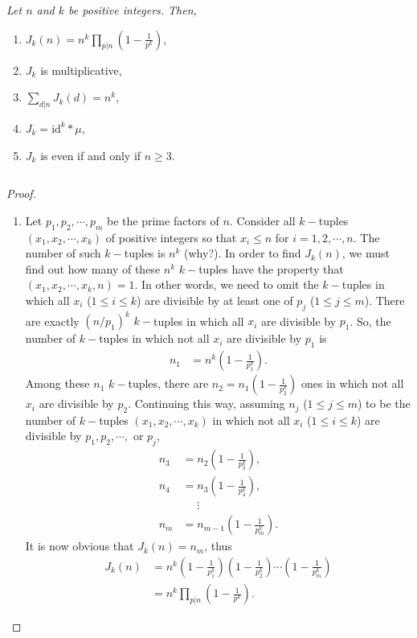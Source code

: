 \documentclass[12pt]{subfile}
\begin{document}
		\begin{theorem} \slshape
			Let $n$ and $k$ be positive integers. Then,
				\begin{enumerate}
					\item $\displaystyle J_k(n) = n^k \prod\limits_{p|n} \left(1 - \frac{1}{p^k}\right)$,
					\item $J_k$ is multiplicative,
					\item $\displaystyle \sum_{d|n} J_k(d) = n^k$,
					\item $J_k = \text{id}^k \ast \mu$,
					\item $J_k$ is even if and only if $n \geq 3$.
				\end{enumerate}
		\end{theorem}
$ $

		\begin{proof}
			$ $
			\begin{enumerate}
				\item Let $p_1,p_2,\cdots,p_m$ be the prime factors of $n$. Consider all $k-$tuples $(x_1,x_2,\cdots,x_k)$ of positive integers so that $x_i\leq n$ for $i=1,2,\cdots,n$. The number of such $k-$tuples is $n^k$ (why?). In order to find $J_k(n)$, we must find out how many of these $n^k$ $k-$tuples have the property that $(x_1,x_2,\cdots,x_k,n)=1$. In other words, we need to omit the $k-$tuples in which all $x_i$ ($1 \leq i \leq k$) are divisible by at least one of $p_j$ ($1 \leq j \leq m$). There are exactly $(n/p_1)^k$ $k-$tuples in which all $x_i$ are divisible by $p_1$. So, the number of $k-$tuples in which not all $x_i$ are divisible by $p_1$ is
					\begin{align*}
						n_1 &= n^k \left(1 - \frac{1}{p_1^k}\right).
					\end{align*}
				Among these $n_1$ $k-$tuples, there are $n_2 = n_1\left(1 - \frac{1}{p_2^k}\right)$ ones in which not all $x_i$ are divisible by $p_2$. Continuing this way, assuming $n_j$ ($1 \leq j \leq m$) to be the number of $k-$tuples $(x_1,x_2,\cdots,x_k)$ in which not all $x_i$ ($1 \leq i \leq k$) are divisible by $p_1, p_2, \cdots, $ or $p_j$,
					\begin{align*}
						n_3 &= n_2 \left(1 - \frac{1}{p_3^k}\right),\\
						n_4 &= n_3 \left(1 - \frac{1}{p_4^k}\right),\\
						&\phantom{=}\vdots\\
						n_m &= n_{m-1} \left(1 - \frac{1}{p_m^k}\right).
					\end{align*}
				It is now obvious that $J_k(n)=n_m$, thus
					\begin{align*}
						J_k(n) &= n^k \left(1 - \frac{1}{p_1^k}\right) \left(1 - \frac{1}{p_2^k}\right)\cdots \left(1 - \frac{1}{p_m^k}\right)\\
							   &= n^k \prod\limits_{p|n} \left(1 - \frac{1}{p^k}\right).
					\end{align*}


\end{enumerate}
\end{proof}
\end{document}
